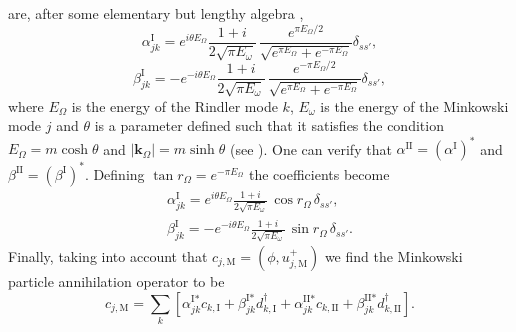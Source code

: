 are, after some elementary but lengthy algebra \cite{Jauregui,Langlois},
\begin{equation}
\alpha^\text{I}_{jk}=e^{i\theta E_\Omega}\frac{1+i}{2\sqrt{\pi E_\omega}}\,\frac{e^{\pi E_\Omega/2}}{\sqrt{e^{\pi E_\Omega}+e^{-\pi E_\Omega}}}\delta_{ss'},
\end{equation}
\begin{equation}
\beta^\text{I}_{jk}=-e^{-i\theta E_\Omega}\frac{1+i}{2\sqrt{\pi E_\omega}}\,\frac{e^{-\pi E_\Omega/2}}{\sqrt{e^{\pi E_\Omega}+e^{-\pi E_\Omega}}}\delta_{s s'},
\end{equation}
where $E_\Omega$ is the energy of the Rindler mode $k$, $E_\omega$ is the energy of the Minkowski mode $j$ and $\theta$ is a parameter defined such that it satisfies the condition $E_\Omega=m\cosh\theta$ and $|\bm k_\Omega|=m\sinh\theta$   (see \cite{Jauregui}).  One can verify that $\alpha^\text{II}=(\alpha^\text{I})^*$ and $\beta^\text{II}=(\beta^\text{I})^*$.  Defining $\tan r_{\Omega}=e^{-\pi E_\Omega}$
the coefficients become
\begin{eqnarray}
\alpha^\text{I}_{jk}=e^{i\theta E_\Omega}\frac{1+i}{2\sqrt{\pi E_\omega}}\,\cos r_{\Omega}\,\delta_{s s'},\nonumber\\
\beta^\text{I}_{jk}=-e^{-i\theta E_\Omega}\frac{1+i}{2\sqrt{\pi E_\omega}}\,\sin r_{\Omega}\,\delta_{s s'}.
\end{eqnarray}
Finally, taking into account that $c_{j,\text{M}}=(\phi, u^+_{j,\text{M}})$  we find the Minkowski particle annihilation operator to be
\begin{equation}
 c_{j,\text{M}}=\sum_{k}\left[\alpha^{\text{I}*}_{jk}c_{k,\text{I}} + \beta^{\text{I}*}_{jk} d_{k,\text{I}}^\dagger+\alpha^{\text{II}*}_{jk}c_{k,\text{II}}+\beta^{\text{II}*}_{jk}d_{k,\text{II}}^{\dagger}\right].
\end{equation}

